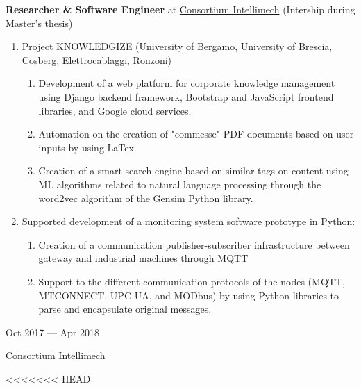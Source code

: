 \documentclass[10pt]{article}
\begin{document}
\begin{minipage}[t]{.80\textwidth}
	\raggedright
	\textbf{Researcher \& Software Engineer} at \href{https://www.intellimech.it/}{Consortium Intellimech} (Intership during Master's thesis)
	\begin{enumerate}
		\item Project KNOWLEDGIZE ({\small University of Bergamo, University of Brescia, Cosberg, Elettrocablaggi, Ronzoni})
		\begin{enumerate}
			\item Development of a web platform for corporate knowledge management using Django backend framework, Bootstrap and JavaScript frontend libraries, and Google cloud services.
			\item Automation on the creation of "commesse" PDF documents based on user inputs by using LaTex.
			\item Creation of a smart search engine based on similar tags on content using ML algorithms related to natural language processing through the word2vec algorithm of the Gensim Python library.
		\end{enumerate}
		\item Supported development of a monitoring system software prototype in Python:
		\begin{enumerate}
			\item Creation of a communication publisher-subscriber infrastructure between gateway and industrial machines through MQTT
			\item Support to the different communication protocols of the nodes (MQTT, MTCONNECT, UPC-UA, and MODbus) by using Python libraries to parse and encapsulate original messages.
		\end{enumerate}
  \end{enumerate}
\end{minipage}%
\hspace{.02\textwidth}\vrule\hspace{.02\textwidth}
\begin{minipage}[t]{.16\textwidth}
	\raggedleft
	{Oct 2017 --- Apr 2018\par}
	{\small Consortium Intellimech\par}
\end{minipage}%
\par
<<<<<<< HEAD
\clearpage
\pagestyle{fancy}
\end{document}
